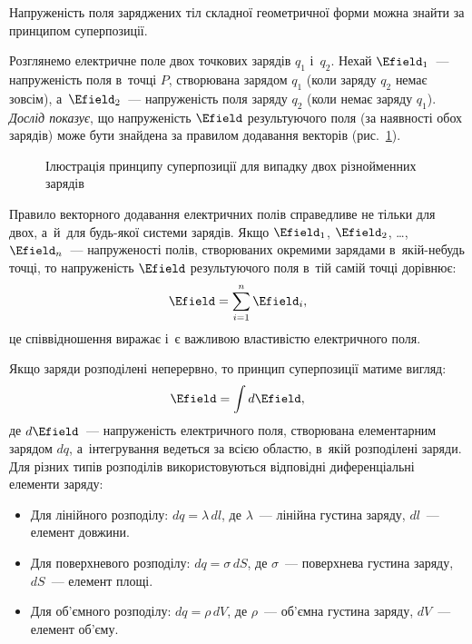 Напруженість поля заряджених тіл складної геометричної форми можна знайти за принципом
суперпозиції.

Розглянемо електричне поле двох точкових зарядів $q_1$ і~$q_2$. Нехай $\Efield_1$~---
напруженість поля в~точці $P$, створювана зарядом $q_1$ (коли заряду $q_2$ немає зовсім),
а~$\Efield_2$~--- напруженість поля заряду $q_2$ (коли немає заряду $q_1$). \emph{Дослід
	показує}, що напруженість $\Efield$ результуючого поля (за наявності обох зарядів) може
бути знайдена за правилом додавання векторів (рис.~\ref{tikz:Superposition}).

\begin{figure}
	\centering
	\caption{Ілюстрація принципу суперпозиції для випадку двох різнойменних зарядів}
	\label{tikz:Superposition}
\end{figure}

Правило векторного додавання електричних полів справедливе не тільки для двох, а~й~для
будь-якої системи зарядів. Якщо $\Efield_1$, $\Efield_2$, \ldots, $\Efield_n$~---
напруженості полів, створюваних окремими зарядами в~якій-небудь точці, то напруженість
$\Efield$ результуючого поля в~тій самій точці дорівнює:
\begin{equation}
	\Efield = \sum_{i=1}^{n} \Efield_i,
\end{equation}
це співвідношення виражає  і~є
важливою властивістю електричного поля.

Якщо заряди розподілені неперервно, то принцип суперпозиції матиме вигляд:
\begin{equation}
	\Efield = \int d\Efield,
\end{equation}
де $d\Efield$~--- напруженість електричного поля, створювана елементарним зарядом $dq$,
а~інтегрування ведеться за всією областю, в~якій розподілені заряди. Для різних типів
розподілів використовуються відповідні диференціальні елементи заряду:

\begin{itemize}
	\item Для лінійного розподілу: $dq = \lambda \, dl$, де $\lambda$~--- лінійна густина
	      заряду, $dl$~--- елемент довжини.
	\item Для поверхневого розподілу: $dq = \sigma \, dS$, де $\sigma$~--- поверхнева
	      густина заряду, $dS$~--- елемент площі.
	\item Для об'ємного розподілу: $dq = \rho \, dV$, де $\rho$~--- об'ємна густина
	      заряду, $dV$~--- елемент об'єму.
\end{itemize}


